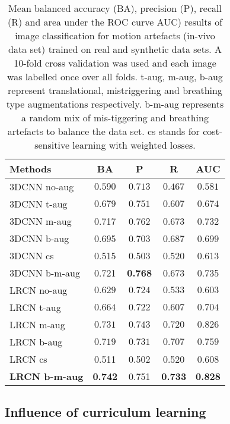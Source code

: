 \documentclass[preprint,12pt,authoryear]{elsarticle}
\begin{document}
\begin{table}

\centering
\caption{Mean balanced accuracy (BA), precision (P), recall (R) and area under the ROC curve AUC) results of image classification for motion artefacts (in-vivo data set) trained on real and synthetic data sets. A 10-fold cross validation was used and each image was labelled once over all folds. t-aug, m-aug, b-aug represent translational, mistriggering and breathing type augmentations respectively. b-m-aug  represents a random mix of  mis-tiggering and breathing artefacts to balance the data set. cs stands for cost-sensitive learning with weighted losses.}
\begin{tabular}{lcccc}
\hline
Methods   &  BA & P & R & AUC \\
\hline

3DCNN no-aug    & $0.590 $ & $0.713$  & $0.467$    & $0.581$    \\
3DCNN t-aug     & $ 0.679 $  & $0.751$  & $0.607$  & $0.674$    \\
3DCNN m-aug     &  0.717 & 0.762 & 0.673 & 0.732  \\
3DCNN b-aug     &  0.695 & 0.703 & 0.687 & 0.699  \\
3DCNN cs        &  0.515 & 0.503 & 0.520& 0.613 \\
3DCNN b-m-aug   &  0.721 & \textbf{0.768} & 0.673 & 0.735    \\
\hline
LRCN no-aug             & $0.629 $ & $0.724$  & $0.533$    & $0.603$    \\
LRCN t-aug              & $0.664 $ & $0.722$  & $0.607$    & $0.704$    \\
LRCN m-aug               &  $ 0.731  $ &   $ 0.743 $  &   $ 0.720 $ &   $0.826$  \\
LRCN b-aug              & $0.719 $ & $0.731$  & $0.707$    & $0.759$     \\
LRCN cs                 &  0.511 & 0.502 & 0.520 & 0.608 \\
\textbf{LRCN b-m-aug}   & \textbf{0.742}  &  0.751 &  \textbf{0.733} &  \textbf{0.828}  \\


\hline
\end{tabular}
\label{table:quan}
\end{table}



\subsection{Influence of curriculum learning}
\label{sec:CurResults}
\end{document}
